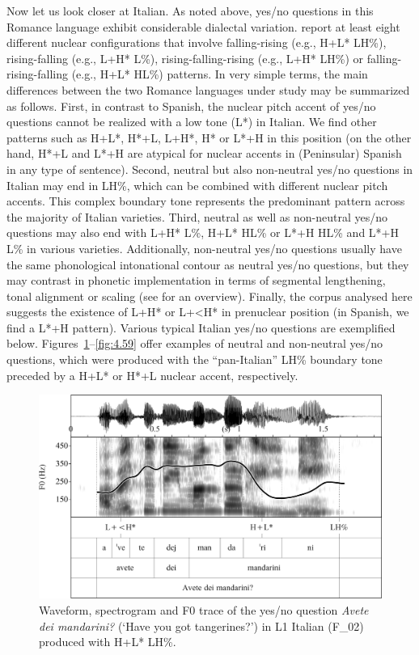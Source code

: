 Now let us look closer at Italian. As noted above, yes/no questions in this Romance language exhibit considerable dialectal variation.  \citet{GiliFivelaEtAl2015} report at least eight different nuclear configurations that involve falling-rising (e.g., H+L* LH\%), rising-falling (e.g., L+H* L\%), rising-falling-rising (e.g., L+H* LH\%) or falling-rising-falling (e.g., H+L* HL\%) patterns. In very simple terms, the main differences between the two Romance languages under study may be summarized as follows. First, in contrast to Spanish, the nuclear pitch accent of yes/no questions cannot be realized with a low tone (L*) in Italian. We find other patterns such as H+L*, H*+L, L+H*, H* or L*+H in this position (on the other hand, H*+L and L*+H are atypical for nuclear accents in (Peninsular) Spanish in any type of sentence). Second, neutral but also non-neutral yes/no questions in Italian may end in LH\%, which can be combined with different nuclear pitch accents. This complex boundary tone represents the predominant pattern across the majority of Italian varieties. Third, neutral as well as non-neutral yes/no questions may also end with L+H* L\%, H+L* HL\% or L*+H HL\% and L*+H L\% in various varieties. Additionally, non-neutral yes/no questions usually have the same phonological intonational contour as neutral yes/no questions, but they may contrast in phonetic implementation in terms of segmental lengthening, tonal alignment or scaling (see  \citealt{GiliFivelaEtAl2015} for an overview). Finally, the corpus analysed here suggests the existence of L+H* or L+<H* in prenuclear position (in Spanish, we find a L*+H pattern). Various typical Italian yes/no questions are exemplified below. Figures~\ref{fig:4.58}--\ref{fig:4.59} offer examples of neutral and non-neutral yes/no questions, which were produced with the “pan-Italian” LH\% boundary tone preceded by a H+L* or H*+L nuclear accent, respectively.


\begin{figure}


\includegraphics[width=\textwidth]{figures/Figure_4.58.png}



\caption{Waveform, spectrogram and F0 trace of the yes/no question \textit{Avete dei mandarini?} (‘Have you got tangerines?’) in L1 Italian (F\_02) produced with H+L* LH\%.}
\label{fig:4.58}
\end{figure}


